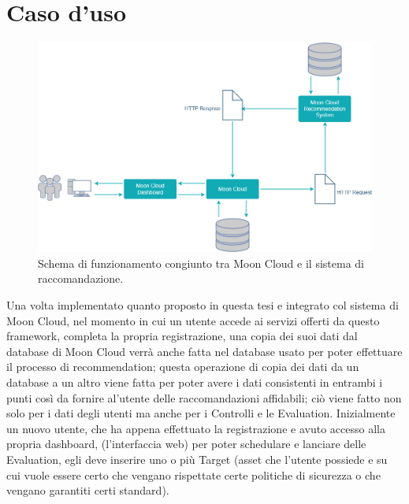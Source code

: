 \chapter{Caso d'uso}\label{chp:05-usecase}
\begin{figure}[ht!]
    \centering
    \includegraphics[scale=0.38]{images/UML_MoonCloud_HowToDo.png}
    \caption{Schema di funzionamento congiunto tra Moon Cloud e il sistema di raccomandazione.}
    \label{fig:UML_MoonCloud_HowToDo}
\end{figure}
\hfill\break
Una volta implementato quanto proposto in questa tesi e integrato col sistema di Moon Cloud, nel momento in cui un utente 
accede ai servizi offerti da questo framework, completa la propria registrazione, una copia dei suoi dati dal database di 
Moon Cloud verrà anche fatta nel database usato per poter effettuare il processo di recommendation; questa operazione di 
copia dei dati da un database a un altro viene fatta per poter avere i dati consistenti in entrambi i punti così da 
fornire al'utente delle raccomandazioni affidabili; ciò viene fatto non solo per i dati degli utenti ma anche per i Controlli 
e le Evaluation.\hfill\break
Inizialmente un nuovo utente, che ha appena effettuato la registrazione e avuto accesso alla propria dashboard, (l'interfaccia 
web) per poter schedulare e lanciare delle Evaluation, egli deve inserire uno o più Target (asset che l'utente possiede e su 
cui vuole essere certo che vengano rispettate certe politiche di sicurezza o che vengano garantiti certi standard).\hfill\break
